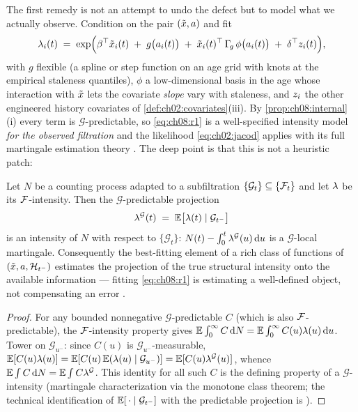 The first remedy is not an attempt to undo the defect but to model what
we actually observe. Condition on the pair $(\tilde{x}, a)$
and fit
\begin{equation}\label{eq:ch08:r1}
\lambda_i(t)
 \;=\;
 \exp\!\Big(
 \beta^{\top} \tilde{x}_i(t)
 \;+\; g\big(a_i(t)\big)
 \;+\; \tilde{x}_i(t)^{\top}\, \Gamma_{\!g}\, \phi\big(a_i(t)\big)
 \;+\; \delta^{\top} z_i(t)
 \Big),
\end{equation}
with $g$ flexible (a spline or step function on an age grid with knots
at the empirical staleness quantiles), $\phi$ a low-dimensional basis in
the age whose interaction with $\tilde{x}$ lets the covariate
\emph{slope} vary with staleness, and $z_i$ the other engineered
history covariates of \cref{def:ch02:covariates}(iii). By
\cref{prop:ch08:internal}(i) every term is $\mathcal{G}$-predictable, so
\cref{eq:ch08:r1} is a well-specified intensity model \emph{for the
observed filtration} and the likelihood \cref{eq:ch02:jacod} applies
with its full martingale estimation theory \citep{abgk1993,
andersengill1982}. The deep point is that this is not a heuristic patch:

\begin{proposition}\label{prop:ch08:projection}
Let $N$ be a counting process adapted to a subfiltration
$\{\mathcal{G}_t\} \subseteq \{\mathcal{F}_{t}\}$ and let $\lambda$ be its
$\mathcal{F}$-intensity. Then the $\mathcal{G}$-predictable projection
\[
\lambda^{\mathcal{G}}(t) \;=\; \mathbb{E}\big[\lambda(t) \mid \mathcal{G}_{t^-}\big]
\]
is an intensity of $N$ with respect to $\{\mathcal{G}_t\}$: $N(t) -
\int_0^t \lambda^{\mathcal{G}}(u)\,\mathrm{d} u$ is a $\mathcal{G}$-local
martingale. Consequently the best-fitting element of a rich class of
functions of $(\tilde{x}, a, \mathcal{H}_{t^-})$ estimates the
projection of the true structural intensity onto the available
information --- fitting \cref{eq:ch08:r1} is estimating a well-defined
object, not compensating an error \citep[Ch.~14]{daley2008}
\citep[II.4]{abgk1993}.
\end{proposition}

\begin{proof}
For any bounded nonnegative $\mathcal{G}$-predictable $C$ (which is also
$\mathcal{F}$-predictable), the $\mathcal{F}$-intensity property gives
$\mathbb{E}\int_0^\infty C\,\mathrm{d} N = \mathbb{E}\int_0^\infty C(u)\lambda(u)\,\mathrm{d} u$. Tower on
$\mathcal{G}_{u^-}$: since $C(u)$ is $\mathcal{G}_{u^-}$-measurable,
$\mathbb{E}[C(u)\lambda(u)] = \mathbb{E}[C(u)\,\mathbb{E}(\lambda(u)\mid\mathcal{G}_{u^-})] =
\mathbb{E}[C(u)\lambda^{\mathcal{G}}(u)]$, whence $\mathbb{E}\int C\,\mathrm{d} N =
\mathbb{E}\int C\lambda^{\mathcal{G}}$. This identity for all such $C$ is the
defining property of a $\mathcal{G}$-intensity (martingale
characterization via the monotone class theorem; the technical
identification of $\mathbb{E}[\,\cdot \mid \mathcal{G}_{t^-}]$ with the
predictable projection is \citealp[Ch.~14]{daley2008}).
\end{proof}

